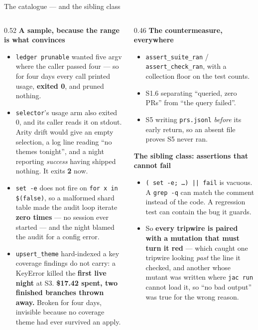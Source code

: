 \documentclass[aspectratio=169,11pt]{beamer}
\newcommand{\good}[1]{\textcolor{jsAccent}{\textbf{#1}}}
\newcommand{\warn}[1]{\textcolor{jsWarm}{\textbf{#1}}}
\begin{document}
\begin{frame}{The catalogue --- and the sibling class}
  \scriptsize
  \begin{columns}[T]
    \begin{column}{0.52\textwidth}
      \textbf{A sample, because the range is what convinces}
      \begin{itemize}
        \item \texttt{ledger prunable} wanted five argv where the caller passed four --- so for four days every call printed usage, \warn{exited 0}, and pruned nothing.
        \item \texttt{selector}'s usage arm also exited 0, and its caller reads it on stdout. Arity drift would give an empty selection, a log line reading ``no themes tonight'', and a night reporting \emph{success} having shipped nothing. It exits \textbf{2} now.
        \item \texttt{set -e} does not fire on \texttt{for x in \$(false)}, so a malformed shard table made the audit loop iterate \warn{zero times} --- no session ever started --- and the night blamed the audit for a config error.
        \item \texttt{upsert\_theme} hard-indexed a key coverage findings do not carry: a KeyError killed the \textbf{first live night} at S3. \warn{\$17.42 spent, two finished branches thrown away.} Broken for four days, invisible because no coverage theme had ever survived an apply.
      \end{itemize}
    \end{column}
    \begin{column}{0.46\textwidth}
      \textbf{The countermeasure, everywhere}
      \begin{itemize}
        \item \texttt{assert\_suite\_ran} / \texttt{assert\_check\_ran}, with a collection floor on the test counts.
        \item S1.6 separating ``queried, zero PRs'' from ``the query failed''.
        \item S5 writing \texttt{prs.jsonl} \emph{before} its early return, so an absent file proves S5 never ran.
      \end{itemize}
      \vspace{0.3em}
      \textbf{The sibling class: assertions that cannot fail}
      \begin{itemize}
        \item \texttt{( set -e; \ldots ) || fail} is vacuous. A \texttt{grep -q} can match the comment instead of the code. A regression test can contain the bug it guards.
        \item So \good{every tripwire is paired with a mutation that must turn it red} --- which caught one tripwire looking \emph{past} the line it checked, and another whose mutant was written where \texttt{jac run} cannot load it, so ``no bad output'' was true for the wrong reason.
      \end{itemize}
    \end{column}
  \end{columns}
\end{frame}
\end{document}
